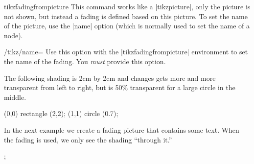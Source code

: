 \begin{environment}{{tikzfadingfrompicture}}
  This command works like a |{tikzpicture}|, only the picture is not
  shown, but instead a fading is defined based on this picture. To set
  the name of the picture, use the |name| option (which is normally
  used to set the name of a node).
  \begin{key}{/tikz/name=}
    Use this option with the |{tikzfadingfrompicture}| environment to
    set the name of the fading. You \emph{must} provide this option.
  \end{key}
  
  The following shading is 2cm by 2cm and changes gets more and more
  transparent from left to right, but is 50\% transparent for a large
  circle in the middle.
\begin{codeexample}[]
\begin{tikzfadingfrompicture}[name=fade right]
  \shade[left color=transparent!0,
         right color=transparent!100] (0,0) rectangle (2,2);
  \fill[transparent!50] (1,1) circle (0.7);
\end{tikzfadingfrompicture}

\end{codeexample}
  In the next example we create a fading picture that contains some
  text. When the fading is used, we only see the shading ``through
  it.'' 
\begin{codeexample}[]
\begin{tikzfadingfrompicture}[name=tikz]
  ;
\end{tikzfadingfrompicture}

\end{codeexample}
\end{environment}

